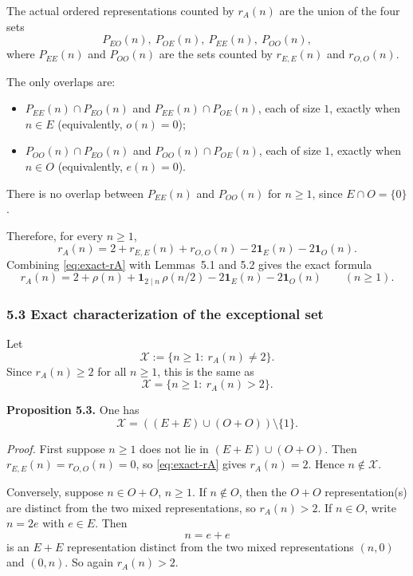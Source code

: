 The actual ordered representations counted by \(r_A(n)\) are the union of the four sets
\[
P_{EO}(n),\ P_{OE}(n),\ P_{EE}(n),\ P_{OO}(n),
\]
where \(P_{EE}(n)\) and \(P_{OO}(n)\) are the sets counted by \(r_{E,E}(n)\) and \(r_{O,O}(n)\).

The only overlaps are:
\begin{itemize}
\item \(P_{EE}(n)\cap P_{EO}(n)\) and \(P_{EE}(n)\cap P_{OE}(n)\), each of size \(1\), exactly when \(n\in E\) (equivalently, \(o(n)=0\));
\item \(P_{OO}(n)\cap P_{EO}(n)\) and \(P_{OO}(n)\cap P_{OE}(n)\), each of size \(1\), exactly when \(n\in O\) (equivalently, \(e(n)=0\)).
\end{itemize}
There is no overlap between \(P_{EE}(n)\) and \(P_{OO}(n)\) for \(n\ge 1\), since \(E\cap O=\{0\}\).

Therefore, for every \(n\ge 1\),
\begin{equation}\label{eq:exact-rA}
r_A(n)=2+r_{E,E}(n)+r_{O,O}(n)-2\mathbf 1_{E}(n)-2\mathbf 1_{O}(n).
\end{equation}
Combining \eqref{eq:exact-rA} with Lemmas~5.1 and 5.2 gives the exact formula
\begin{equation}\label{eq:exact-rA-rho}
r_A(n)=2+\rho(n)+\mathbf 1_{2\mid n}\,\rho(n/2)-2\mathbf 1_E(n)-2\mathbf 1_O(n)
\qquad(n\ge 1).
\end{equation}

\subsubsection*{5.3 Exact characterization of the exceptional set}
Let
\[
\mathcal X:=\{n\ge 1:\ r_A(n)\ne 2\}.
\]
Since \(r_A(n)\ge 2\) for all \(n\ge 1\), this is the same as
\[
\mathcal X=\{n\ge 1:\ r_A(n)>2\}.
\]

\medskip
\noindent
\textbf{Proposition 5.3.}
One has
\[
\mathcal X=((E+E)\cup(O+O))\setminus\{1\}.
\]

\medskip
\noindent
\emph{Proof.}
First suppose \(n\ge 1\) does not lie in \((E+E)\cup(O+O)\). Then \(r_{E,E}(n)=r_{O,O}(n)=0\), so \eqref{eq:exact-rA} gives \(r_A(n)=2\). Hence \(n\notin\mathcal X\).

Conversely, suppose \(n\in O+O\), \(n\ge 1\). If \(n\notin O\), then the \(O+O\) representation(s) are distinct from the two mixed representations, so \(r_A(n)>2\). If \(n\in O\), write \(n=2e\) with \(e\in E\). Then
\[
n=e+e
\]
is an \(E+E\) representation distinct from the two mixed representations \((n,0)\) and \((0,n)\). So again \(r_A(n)>2\).

